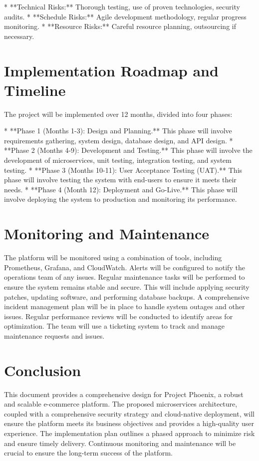 \documentclass[11pt,a4paper,oneside]{article}
\begin{document}
* **Technical Risks:**  Thorough testing, use of proven technologies, security audits.
* **Schedule Risks:**  Agile development methodology, regular progress monitoring.
* **Resource Risks:**  Careful resource planning, outsourcing if necessary.

\section{Implementation Roadmap and Timeline}

The project will be implemented over 12 months, divided into four phases:

* **Phase 1 (Months 1-3): Design and Planning.**  This phase will involve requirements gathering, system design, database design, and API design.
* **Phase 2 (Months 4-9): Development and Testing.**  This phase will involve the development of microservices, unit testing, integration testing, and system testing.
* **Phase 3 (Months 10-11): User Acceptance Testing (UAT).**  This phase will involve testing the system with end-users to ensure it meets their needs.
* **Phase 4 (Month 12): Deployment and Go-Live.**  This phase will involve deploying the system to production and monitoring its performance.

\section{Monitoring and Maintenance}

The platform will be monitored using a combination of tools, including Prometheus, Grafana, and CloudWatch.  Alerts will be configured to notify the operations team of any issues.  Regular maintenance tasks will be performed to ensure the system remains stable and secure.  This will include applying security patches, updating software, and performing database backups.  A comprehensive incident management plan will be in place to handle system outages and other issues.  Regular performance reviews will be conducted to identify areas for optimization.  The team will use a ticketing system to track and manage maintenance requests and issues.

\section{Conclusion}

This document provides a comprehensive design for Project Phoenix, a robust and scalable e-commerce platform.  The proposed microservices architecture, coupled with a comprehensive security strategy and cloud-native deployment, will ensure the platform meets its business objectives and provides a high-quality user experience.  The implementation plan outlines a phased approach to minimize risk and ensure timely delivery.  Continuous monitoring and maintenance will be crucial to ensure the long-term success of the platform.
\end{document}

